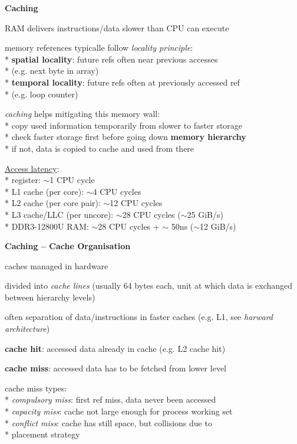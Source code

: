 \textbf{Caching}
\begin{items}
	\item RAM delivers instructions/data slower than CPU can execute
	\item memory references typicalle follow \emph{locality principle}: \\*
		\textbf{spatial locality}: future refs often near previous accesses \\*
			\phantom{x} (e.g. next byte in array) \\*
		\textbf{temporal locality}: future refs often at previously accessed ref \\*
			\phantom{x} (e.g. loop counter)
	\item \emph{caching} helps mitigating this memory wall: \\*
		copy used information temporarily from slower to faster storage \\*
		check faster storage first before going down \textbf{memory hierarchy} \\*
		if not, data is copied to cache and used from there
	\item \underline{Access latency}: \\*
		register: \( \sim \)1 CPU cycle \\*
		L1 cache (per core): \( \sim \)4 CPU cycles \\*
		L2 cache (per core pair): \( \sim \)12 CPU cycles \\*
		L3 cache/LLC (per uncore): \( \sim \)28 CPU cycles (\( \sim \)25 GiB/s) \\*
		DDR3-12800U RAM: \( \sim \)28 CPU cycles + \( \sim \) 50ns (\( \sim \)12 GiB/s)
\end{items}

\textbf{Caching -- Cache Organisation}
\begin{items}
	\item caches managed in hardware
	\item divided into \emph{cache lines} (usually 64 bytes each, unit at which data is exchanged between hierarchy levels)
	\item often separation of data/instructions in faster caches (e.g. L1, see \emph{harward architecture})
	\item \textbf{cache hit}: accessed data already in cache (e.g. L2 cache hit)
	\item \textbf{cache miss}: accessed data has to be fetched from lower level
	\item cache miss types: \\*
		\emph{compulsory miss}: first ref miss, data never been accessed \\*
		\emph{capacity miss}: cache not large enough for process working set \\*
		\emph{conflict miss}: cache has still space, but collisions due to \\* \phantom{x} placement strategy
\end{items}

